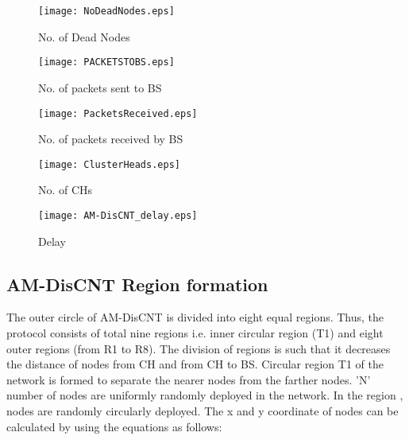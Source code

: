 \documentclass[journal]{IEEEtran}
\begin{document}
\begin{figure}[ht]
\begin{center}
\texttt{[image: NoDeadNodes.eps]}
\vspace{-0.7cm}
\caption{No. of Dead Nodes}
\end{center}
\end{figure}

\begin{figure}[ht]
\begin{center}
\texttt{[image: PACKETSTOBS.eps]}
\vspace{-0.7cm}
\caption{No. of packets sent to BS}
\end{center}
\end{figure}

\begin{figure}[ht]
\begin{center}
\texttt{[image: PacketsReceived.eps]}
\vspace{-0.7cm}
\caption{No. of packets received by BS}
\end{center}
\end{figure}

\begin{figure}[ht]
\begin{center}
\texttt{[image: ClusterHeads.eps]}
\vspace{-0.7cm}
\caption{No. of CHs}
\end{center}
\end{figure}

\begin{figure}[ht]
\begin{center}
\texttt{[image: AM-DisCNT\_delay.eps]}
\vspace{-0.7cm}
\caption{Delay}
\end{center}
\end{figure}

\subsection{AM-DisCNT Region formation}
 The outer circle of AM-DisCNT is divided into eight equal regions. Thus, the protocol consists of total nine regions i.e. inner circular region (T1) and eight outer regions (from R1 to R8). The division of regions is such that it decreases the distance of nodes from CH and from CH to BS. Circular region T1 of the network is formed to separate the nearer nodes from the farther nodes. 'N' number of nodes are uniformly randomly deployed in the network.
 In the region , nodes  are randomly circularly deployed. The x and y coordinate of nodes  can be calculated by using the equations as follows:
\end{document}
